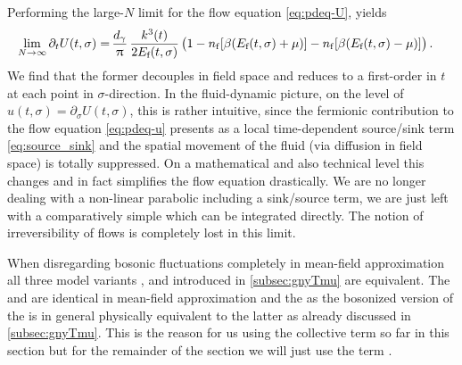 Performing the large-$N$ limit for the flow equation \eqref{eq:pdeq-U}, yields
\begin{align}
	\lim\limits_{N \rightarrow \infty} \partial_t U ( t,  \sigma ) =\, & \frac{d_\gamma}{\mkern1.0mu\uppi\mkern1.0mu} \, \frac{k^3 ( t )}{2 E_{\textrm{f}} ( t, \sigma )} \, \big( 1 - n_\mathrm{f} [ \beta ( E_{\textrm{f}} ( t, \sigma ) + \mu ) ] - n_\mathrm{f} [ \beta ( E_{\textrm{f}} ( t, \sigma ) - \mu ) ] \big) \, .\label{eq:pdeq-U-MF}
\end{align}
We find that the former \pde{} decouples in field space and reduces to a first-order \ode{} in $t$ at each point in $\sigma$-direction.
In the fluid-dynamic picture, on the level of $u ( t, \sigma ) = \partial_\sigma U ( t,  \sigma )$, this is rather intuitive, since the fermionic contribution to the flow equation \eqref{eq:pdeq-u} presents as a local time-dependent source/sink term \eqref{eq:source_sink} and the spatial movement of the fluid (via diffusion in field space) is totally suppressed.
On a mathematical and also technical level this changes and in fact simplifies the flow equation drastically.
We are no longer dealing with a non-linear parabolic \pde{} including a sink/source term, we are just left with a comparatively simple \ode{} which can be integrated directly.
The notion of irreversibility of \frg{} flows is completely lost in this limit.

When disregarding bosonic fluctuations completely in mean-field approximation all three model variants \dash{} \gn{}, \bgn{} and \gnym{} \dash{} introduced in \cref{subsec:gnyTmu} are equivalent. 
The \bgn{} and \gnym{} are identical in mean-field approximation and the \bgnm{} as the bosonized version of the \gnm{} is in general physically equivalent to the latter as already discussed in \cref{subsec:gnyTmu}.
This is the reason for us using the collective term \gnyBm{} so far in this section but for the remainder of the section we will just use the term \gnm{}.

